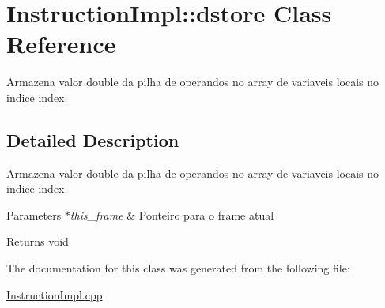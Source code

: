 \hypertarget{class_instruction_impl_1_1dstore}{}\section{Instruction\+Impl\+:\+:dstore Class Reference}
\label{class_instruction_impl_1_1dstore}


Armazena valor double da pilha de operandos no array de variaveis locais no indice index.  




\subsection{Detailed Description}
Armazena valor double da pilha de operandos no array de variaveis locais no indice index. 


\begin{DoxyParams}{Parameters}
{\em $\ast$this\+\_\+frame} & Ponteiro para o frame atual \\
\hline
\end{DoxyParams}
\begin{DoxyReturn}{Returns}
void 
\end{DoxyReturn}


The documentation for this class was generated from the following file\+:\begin{DoxyCompactItemize}
\item 
\hyperlink{_instruction_impl_8cpp}{Instruction\+Impl.\+cpp}\end{DoxyCompactItemize}
